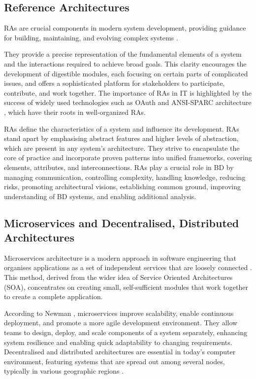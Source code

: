 \documentclass[journal]{IEEEtran}
\begin{document}
\subsection{Reference Architectures} 

RAs are crucial components in modern system development, providing guidance for building, maintaining, and evolving complex systems \cite{Cloutier2010}. 

They provide a precise representation of the fundamental elements of a system and the interactions required to achieve broad goals. This clarity encourages the development of digestible modules, each focusing on certain parts of complicated issues, and offers a sophisticated platform for stakeholders to participate, contribute, and work together. The importance of RAs in IT is highlighted by the success of widely used technologies such as OAuth \cite{OATH} and ANSI-SPARC architecture \cite{ANSI}, which have their roots in well-organized RAs. 

RAs define the characteristics of a system and influence its development. RAs stand apart by emphasising abstract features and higher levels of abstraction, which are present in any system's architecture. They strive to encapsulate the core of practice and incorporate proven patterns into unified frameworks, covering elements, attributes, and interconnections. RAs play a crucial role in BD by managing communication, controlling complexity, handling knowledge, reducing risks, promoting architectural visions, establishing common ground, improving understanding of BD systems, and enabling additional analysis. 

\subsection{Microservices and Decentralised, Distributed Architectures} 

Microservices architecture is a modern approach in software engineering that organises applications as a set of independent services that are loosely connected \cite{bucchiarone2020microservices}. This method, derived from the wider idea of Service Oriented Architectures (SOA), concentrates on creating small, self-sufficient modules that work together to create a complete application. 

According to Newman \cite{newman2021building}, microservices improve scalability, enable continuous deployment, and promote a more agile development environment. They allow teams to design, deploy, and scale components of a system separately, enhancing system resilience and enabling quick adaptability to changing requirements. Decentralised and distributed architectures are essential in today's computer environment, featuring systems that are spread out among several nodes, typically in various geographic regions \cite{ataei2023application}. 
\end{document}
